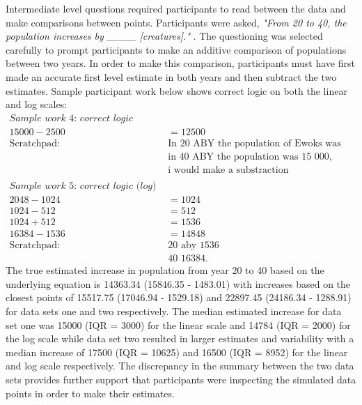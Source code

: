 \documentclass[print]{nuthesis}
\begin{document}
Intermediate level questions required participants to read between the data and make comparisons between points.
Participants were asked, \textit{"From 20 to 40, the population increases by \_\_\_\_ [creatures]."} .
The questioning was selected carefully to prompt participants to make an additive comparison of populations between two years.
In order to make this comparison, participants must have first made an accurate first level estimate in both years and then subtract the two estimates.
Sample participant work below shows correct logic on both the linear and log scales:
\begin{align}
\textit{Sample work 4: correct logic (linear)} \nonumber\\
15000 - 2500 & = 12500\nonumber\\
\text{Scratchpad: } &\text{In 20 ABY the population of Ewoks was 2500,}\nonumber\\
                   &\text{in 40 ABY the population was 15 000,}\nonumber\\
                   &\text{i would make a substraction}\nonumber \\
\nonumber \\
\textit{Sample work 5: correct logic (log)} \nonumber\\
2048 - 1024  & = 1024 \nonumber\\
1024 - 512   & = 512 \nonumber\\
1024 + 512   & = 1536 \nonumber\\
16384 - 1536 & = 14848 \nonumber\\
\text{Scratchpad: }  & \text{20 aby 1536} \nonumber\\
             & \text{40 16384.} \nonumber
\end{align}
The true estimated increase in population from year 20 to 40 based on the underlying equation is 14363.34 (15846.35 - 1483.01) with increases based on the closest points of 15517.75 (17046.94 - 1529.18) and 22897.45 (24186.34 - 1288.91) for data sets one and two respectively.
The median estimated increase for data set one was 15000 (IQR = 3000) for the linear scale and 14784 (IQR = 2000) for the log scale while data set two resulted in larger estimates and variability with a median increase of 17500 (IQR = 10625) and 16500 (IQR = 8952) for the linear and log scale respectively.
The discrepancy in the summary between the two data sets provides further support that participants were inspecting the simulated data points in order to make their estimates.
\end{document}
